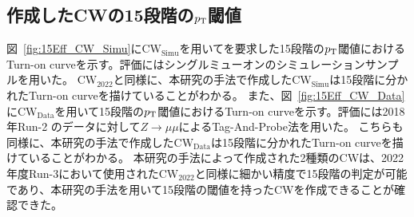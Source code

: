 \subsection{作成したCWの15段階の$p_{\rm{T}}$閾値}
図~\ref{fig:15Eff_CW_Simu}に$\mathrm{CW_{Simu}}$を用いてを要求した15段階の$p_{\rm{T}}$閾値におけるTurn-on curveを示す。評価にはシングルミューオンのシミュレーションサンプルを用いた。
$\mathrm{CW_{2022}}$と同様に、本研究の手法で作成した$\mathrm{CW_{Simu}}$は15段階に分かれたTurn-on curveを描けていることがわかる。
また、図~\ref{fig:15Eff_CW_Data}に$\mathrm{CW_{Data}}$を用いて15段階の$p_{\rm{T}}$閾値におけるTurn-on curveを示す。評価には2018年Run-2 のデータに対して$Z\rightarrow \mu\mu$によるTag-And-Probe法を用いた。
こちらも同様に、本研究の手法で作成した$\mathrm{CW_{Data}}$は15段階に分かれたTurn-on curveを描けていることがわかる。
本研究の手法によって作成された2種類のCWは、2022年度Run-3において使用された$\mathrm{CW_{2022}}$と同様に細かい精度で15段階の判定が可能であり、本研究の手法を用いて15段階の閾値を持ったCWを作成できることが確認できた。

